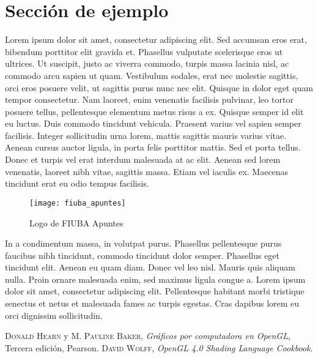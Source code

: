 \documentclass[a4paper, twoside]{article}
\begin{document}
\newpage
\section{Sección de ejemplo}

Lorem ipsum dolor sit amet, consectetur adipiscing elit. Sed accumsan eros erat, bibendum porttitor elit gravida et. Phasellus vulputate scelerisque eros ut ultrices. Ut suscipit, justo ac viverra commodo, turpis massa lacinia nisl, ac commodo arcu sapien ut quam. Vestibulum sodales, erat nec molestie sagittis, orci eros posuere velit, ut sagittis purus nunc nec elit. Quisque in dolor eget quam tempor consectetur. Nam laoreet, enim venenatis facilisis pulvinar, leo tortor posuere tellus, pellentesque elementum metus risus a ex. Quisque semper id elit eu luctus. Duis commodo tincidunt vehicula. Praesent varius vel sapien semper facilisis. Integer sollicitudin urna lorem, mattis sagittis mauris varius vitae. Aenean cursus auctor ligula, in porta felis porttitor mattis. Sed et porta tellus. Donec et turpis vel erat interdum malesuada at ac elit. Aenean sed lorem venenatis, laoreet nibh vitae, sagittis massa. Etiam vel iaculis ex. Maecenas tincidunt erat eu odio tempus facilisis.

\begin{figure}[H] %
	\centering %
	\texttt{[image: fiuba\_apuntes]} %
	\caption{Logo de FIUBA Apuntes} %
	\label{fig:fiuba_apuntes} %
\end{figure}

In a condimentum massa, in volutpat purus. Phasellus pellentesque purus faucibus nibh tincidunt, commodo tincidunt dolor semper. Phasellus eget tincidunt elit. Aenean eu quam diam. Donec vel leo nisl. Mauris quis aliquam nulla. Proin ornare malesuada enim, sed maximus ligula congue a. Lorem ipsum dolor sit amet, consectetur adipiscing elit. Pellentesque habitant morbi tristique senectus et netus et malesuada fames ac turpis egestas. Cras dapibus lorem eu orci dignissim sollicitudin.

\newpage
\newcommand{\bibliographyname}{Bibliografía} %
\addcontentsline{toc}{section}{\bibliographyname} %
\renewcommand\refname{\bibliographyname} %
\begin{thebibliography}{X}
	 \textsc{Donald Hearn} y \textsc{M. Pauline Baker}, \textit{Gráficos por computadora en OpenGL}, Tercera edición, Pearson.
	 \textsc{David Wolff}, \textit{OpenGL 4.0 Shading Language Cookbook}.
\end{thebibliography}
\end{document}
